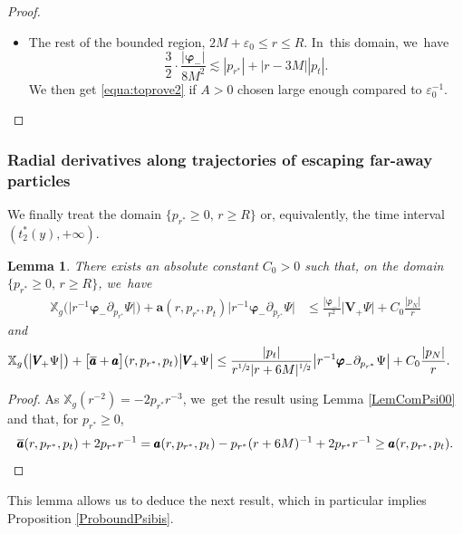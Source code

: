 \documentclass[10pt]{amsart}
\let\epsilon\varepsilon
\theoremstyle{plain}
\newtheorem{lemma}[proposition]{Lemma}
\theoremstyle{definition}
\newcommand\T{{\mathbb{X}}}
\begin{document}
\begin{proof}
\begin{itemize}
\begin{align*}
\frac{|\pmb{\varphi}_-|}{8M^2}& \leq \frac{2r|p_u|}{8M^2 \Omega^2}+ \frac{1}{8M^2} \cdot\frac{27M^2r^{\sfrac{1}{2}} |p_t|}{r^{\sfrac{3}{2}}-|r+6M|^{\sfrac{1}{2}}(r-3M)} \\
& \leq \Big|1+\frac{\epsilon_0}{2M}\Big|^3 \cdot \frac{2M|p_u|}{r^2 \Omega^2}+\frac{c_0}{2}A|r-3M||p_t|,
\end{align*}
provided that $A>0$ is large enough. We~get \eqref{equa:toprove2} if $\epsilon_0$ is small enough so that $\frac{3}{2}\big|1+\sfrac{\epsilon_0}{2M}\big|^3\leq 2$.
\item The rest of the bounded region, $2M+\epsilon_0 \leq r \leq R$. In~this domain, we~have
\[
\frac{3}{2} \cdot \frac{|\pmb{\varphi}_-|}{8M^2} \lesssim |p_{r^*}|+|r-3M||p_t|.
\]
We then get \eqref{equa:toprove2} if $A>0$ chosen large enough compared to $\epsilon_0^{-1}$.\qedhere
\end{itemize}
\end{proof}

\subsubsection{Radial derivatives along trajectories of escaping far-away particles}

We finally treat the domain $\{ p_{r^*} \geq 0, \, r \geq R \}$ or, equivalently, the time interval $(t_2^*(y),+\infty)$.

\begin{lemma}\label{LemComPsi000}
There exists an absolute constant $C_0 >0$ such that, on the domain $\{ p_{r^*} \geq 0, \, r \geq R \}$, we~have
\begin{align*}
\T_g \bigl(\big| r^{-1} \pmb{\varphi}_- \partial_{p_{r^*}} \Psi \big| \bigr) +\pmb{a} (r,p_{r^*},p_t) \big| r^{-1} \pmb{\varphi}_- \partial_{p_{r^*}} \Psi \big| & \leq \frac{|\pmb{\varphi}_-|}{r^2} \big| \pmb{V}_{\! +} \Psi \big|+C_0\frac{|p_N|}{r}
\end{align*}
and
\begin{align*}
\T_g \bigl(\big| \pmb{V}_{\! +} \Psi \big| \bigr) + \bigl[\overline{\pmb{a}} + \pmb{a} \bigr](r,p_{r^*},p_t) \big| \pmb{V}_{\! +} \Psi \big| & \leq \frac{|p_t|}{r^{\sfrac{1}{2}}|r+6M|^{\sfrac{1}{2}}}\big| r^{-1} \pmb{\varphi}_- \partial_{p_{r^*}}\Psi \big|+C_0\frac{|p_N|}{r}.
\end{align*}
\end{lemma}
\begin{proof}
As $\T_g(r^{-2})=-2p_{r^*}r^{-3} $, we~get the result using Lemma \ref{LemComPsi00} and that, for $p_{r^*} \geq 0$,
\[
\overline{\pmb{a}} (r,p_{r^*},p_t)+2p_{r^*}r^{-1}=\pmb{a}(r,p_{r^*},p_t)-p_{r^*}(r+6M)^{-1}+2p_{r^*}r^{-1} \geq \pmb{a}(r,p_{r^*},p_t).\qedhere
\]
\end{proof}
This lemma allows us to deduce the next result, which in particular implies Proposition \ref{ProboundPsibis}.
\end{document}
